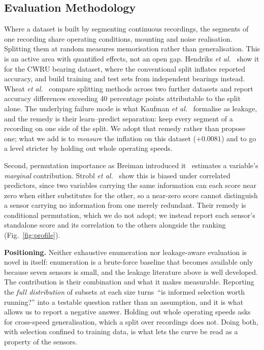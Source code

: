 \documentclass[conference]{IEEEtran}
\begin{document}
\subsection{Evaluation Methodology}
\label{sec:relatedmethod}

Where a dataset is built by segmenting continuous recordings, the segments of
one recording share operating conditions, mounting and noise realisation.
Splitting them at random measures memorisation rather than generalisation.
This is an active area with quantified effects, not an open gap. Hendriks
\emph{et al.}~\cite{hendriks2022} show it for the CWRU bearing dataset, where
the conventional split inflates reported accuracy, and build training and test
sets from independent bearings instead. Wheat \emph{et al.}~\cite{wheat2024}
compare splitting methods across two further datasets and report accuracy
differences exceeding 40 percentage points attributable to the split alone.
The underlying failure mode is what Kaufman \emph{et al.}~\cite{kaufman2011}
formalise as leakage, and the remedy is their learn--predict separation: keep
every segment of a recording on one side of the split. We adopt that remedy
rather than propose one; what we add is to \emph{measure} the inflation on
this dataset ($+0.0081$) and to go a level stricter by holding out whole
operating speeds.

Second, permutation importance as Breiman introduced it~\cite{breiman2001}
estimates a variable's \emph{marginal} contribution. Strobl \emph{et
al.}~\cite{strobl2008} show this is biased under correlated predictors, since
two variables carrying the same information can each score near zero when
either substitutes for the other, so a near-zero score cannot distinguish a
sensor carrying no information from one merely redundant. Their remedy is
conditional permutation, which we do not adopt; we instead report each sensor's
standalone score and its correlation to the others alongside the ranking
(Fig.~\ref{fig:profile}).

\textbf{Positioning.} Neither exhaustive enumeration nor leakage-aware
evaluation is novel in itself: enumeration is a brute-force baseline that
becomes available only because seven sensors is small, and the leakage
literature above is well developed. The contribution is their combination and what it makes measurable. Reporting the \emph{full distribution}
of subsets at each size turns \,``is informed selection worth running?'' into a
testable question rather than an assumption, and it is what allows us to
report a negative answer. Holding out whole operating speeds asks for cross-speed generalisation, which
a split over recordings does not. Doing both, with selection confined to
training data, is what lets the curve be read as a property of the sensors.
\end{document}
